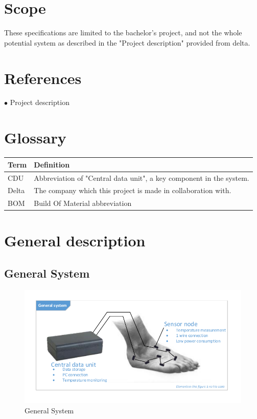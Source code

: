 \section{Scope}
These specifications are limited to the bachelor's project, and not the whole potential system as described in the "Project description" provided from delta.\\

\section{References}
$\bullet$ Project description

\section{Glossary}
\begin{table}[H]
\centering
\begin{tabular}{|p{4cm}|p{7cm}|}
\hline
Term & Definition\\ \hline
CDU & Abbreviation of "Central data unit", a key component in the system. \\ \hline
Delta & The company which this project is made in collaboration with.\\ \hline
BOM & Build Of Material abbreviation\\ \hline
\end{tabular}
\end{table}

\section{General description}

\subsection{General System}
\begin{figure}[H]
	\centering
	\includegraphics[width=1\textwidth]{billeder/GeneralSystem}
	\caption{General System}
\end{figure}


